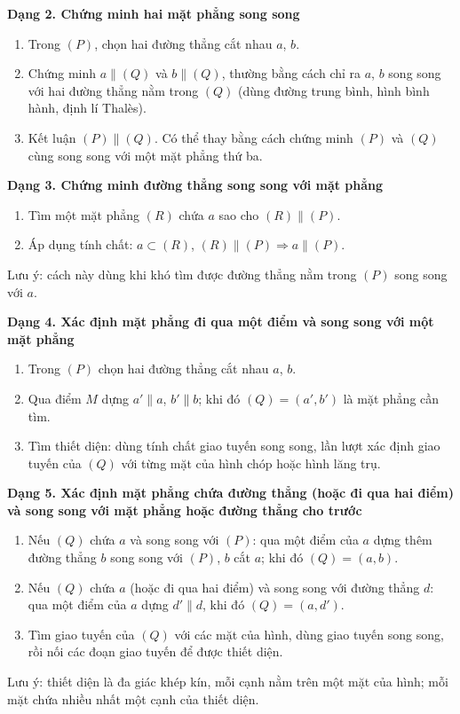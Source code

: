 \textbf{Dạng 2. Chứng minh hai mặt phẳng song song}
\begin{enumerate}
\item Trong $(P)$, chọn hai đường thẳng cắt nhau $a$, $b$.
\item Chứng minh $a\parallel(Q)$ và $b\parallel(Q)$, thường bằng cách chỉ ra $a$, $b$ song song với hai đường thẳng nằm trong $(Q)$ (dùng đường trung bình, hình bình hành, định lí Thalès).
\item Kết luận $(P)\parallel(Q)$. Có thể thay bằng cách chứng minh $(P)$ và $(Q)$ cùng song song với một mặt phẳng thứ ba.
\end{enumerate}

\textbf{Dạng 3. Chứng minh đường thẳng song song với mặt phẳng}
\begin{enumerate}
\item Tìm một mặt phẳng $(R)$ chứa $a$ sao cho $(R)\parallel(P)$.
\item Áp dụng tính chất: $a\subset(R)$, $(R)\parallel(P)\Rightarrow a\parallel(P)$.
\end{enumerate}
Lưu ý: cách này dùng khi khó tìm được đường thẳng nằm trong $(P)$ song song với $a$.

\textbf{Dạng 4. Xác định mặt phẳng đi qua một điểm và song song với một mặt phẳng}
\begin{enumerate}
\item Trong $(P)$ chọn hai đường thẳng cắt nhau $a$, $b$.
\item Qua điểm $M$ dựng $a'\parallel a$, $b'\parallel b$; khi đó $(Q)=(a',b')$ là mặt phẳng cần tìm.
\item Tìm thiết diện: dùng tính chất giao tuyến song song, lần lượt xác định giao tuyến của $(Q)$ với từng mặt của hình chóp hoặc hình lăng trụ.
\end{enumerate}

\textbf{Dạng 5. Xác định mặt phẳng chứa đường thẳng (hoặc đi qua hai điểm) và song song với mặt phẳng hoặc đường thẳng cho trước}
\begin{enumerate}
\item Nếu $(Q)$ chứa $a$ và song song với $(P)$: qua một điểm của $a$ dựng thêm đường thẳng $b$ song song với $(P)$, $b$ cắt $a$; khi đó $(Q)=(a,b)$.
\item Nếu $(Q)$ chứa $a$ (hoặc đi qua hai điểm) và song song với đường thẳng $d$: qua một điểm của $a$ dựng $d'\parallel d$, khi đó $(Q)=(a,d')$.
\item Tìm giao tuyến của $(Q)$ với các mặt của hình, dùng giao tuyến song song, rồi nối các đoạn giao tuyến để được thiết diện.
\end{enumerate}
Lưu ý: thiết diện là đa giác khép kín, mỗi cạnh nằm trên một mặt của hình; mỗi mặt chứa nhiều nhất một cạnh của thiết diện.

